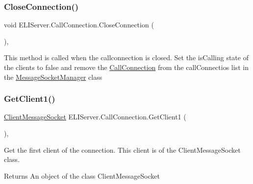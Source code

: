 \subsubsection{\texorpdfstring{Close\+Connection()}{CloseConnection()}}
{\footnotesize\ttfamily void E\+L\+I\+Server.\+Call\+Connection.\+Close\+Connection (\begin{DoxyParamCaption}{ }\end{DoxyParamCaption})\hspace{0.3cm}{\ttfamily [inline]}, {\ttfamily [private]}}





This method is called when the callconnection is closed. Set the is\+Calling state of the clients to false and remove the \hyperlink{class_e_l_i_server_1_1_call_connection}{Call\+Connection} from the call\+Connectios list in the \hyperlink{class_e_l_i_server_1_1_message_socket_manager}{Message\+Socket\+Manager} class \mbox{\label{class_e_l_i_server_1_1_call_connection_ae65d1e69b626abc7d354ca87ab800b12}} 
\subsubsection{\texorpdfstring{Get\+Client1()}{GetClient1()}}
{\footnotesize\ttfamily \hyperlink{class_e_l_i_server_1_1_messaging_1_1_client_message_socket}{Client\+Message\+Socket} E\+L\+I\+Server.\+Call\+Connection.\+Get\+Client1 (\begin{DoxyParamCaption}{ }\end{DoxyParamCaption})\hspace{0.3cm}{\ttfamily [inline]}, {\ttfamily [package]}}



Get the first client of the connection. This client is of the Client\+Message\+Socket class. 

\begin{DoxyReturn}{Returns}
An object of the class Client\+Message\+Socket
\end{DoxyReturn}
\mbox{\label{class_e_l_i_server_1_1_call_connection_ad424584ee59e02e9a3ac7b1993694683}} 

